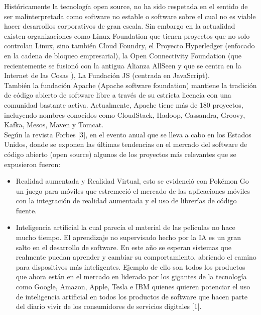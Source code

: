 \begin{multicols}{2}
Históricamente la tecnología open source, no ha sido respetada en el sentido de ser malinterpretada como software no estable o software sobre el cual no es viable hacer desarrollos corporativos de gran escala. Sin embargo en la actualidad existen organizaciones como Linux Foundation que tienen proyectos que no solo controlan Linux, sino también Cloud Foundry, el Proyecto Hyperledger (enfocado en la cadena de bloqueo empresarial), la Open Connectivity Foundation (que recientemente se fusionó con la antigua Alianza AllSeen y que se centra en la Internet de las Cosas ), La Fundación JS (centrada en JavaScript).\\

También la fundación Apache (Apache software foundation) mantiene la tradición de código abierto de software libre a través de su estricta licencia con una comunidad bastante activa. Actualmente, Apache tiene más de 180 proyectos, incluyendo nombres conocidos como CloudStack, Hadoop, Cassandra, Groovy, Kafka, Mesos, Maven y Tomcat.\\


Según la revista Forbes [3], en el evento anual que se lleva a cabo en los Estados Unidos, donde se exponen las últimas tendencias en el mercado del software de código abierto (open source) algunos de los proyectos más relevantes que se expusieron fueron:\\



\begin{itemize}
\item Realidad aumentada y Realidad Virtual, esto se evidenció con Pokémon Go un juego para móviles que estremeció el mercado de las aplicaciones móviles con la integración de realidad aumentada y el uso de librerías de código fuente.

\item Inteligencia artificial la cual parecía el material de las películas no hace mucho tiempo. El aprendizaje no  supervisado hecho por la IA es un gran salto en el desarrollo de software. En este año se esperan sistemas que realmente puedan aprender y cambiar su comportamiento, abriendo el camino para dispositivos más inteligentes. Ejemplo de ello son todos los productos que ahora están en el mercado en liderado por los gigantes de la tecnología como Google, Amazon, Apple, Tesla e IBM quienes quieren potenciar el uso de inteligencia artificial en todos los productos de software que hacen parte del diario vivir de los consumidores de servicios digitales [1].
\end{itemize}






\end{multicols}
